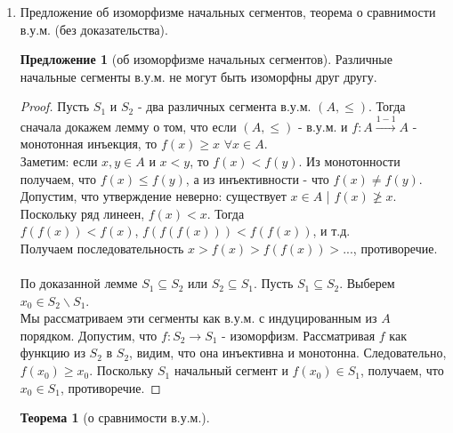 \documentclass[a4paper]{article}
\newtheorem*{theorem*}{Теорема}
\newtheorem*{lemma*}{Лемма}
\theoremstyle{definition}
\newtheorem*{proposition*}{Предложение}
\begin{document}
\begin{enumerate}
       \begin{lemma*}[о начальных сегментах в.у.м.]
        Любой начальный сегмент в.у.м. $(A, \leq)$ либо равен $A$, либо является начальным отрезком.
       \end{lemma*}
       \begin{proof}
        Пусть $S$ - начальный сегмент в $A$ и $S \neq A$. Тогда $A \backslash S \neq \emptyset$. Пусть $x$ - минимальный элемент в $A \backslash S$. Покажем, что $S = A_x$. Если $y \in S$, то либо $y < x$, либо $x \leq y$. Второй случай невозможен, так как тогда $x \in S$.
       \end{proof}
 \item Предложение об изоморфизме начальных сегментов, теорема о сравнимости в.у.м. (без доказательства).
       \begin{proposition*}[об изоморфизме начальных сегментов]
        Различные начальные сегменты в.у.м. не могут быть изоморфны друг другу.
       \end{proposition*}
       \begin{proof}
        Пусть $S_1$ и $S_2$ - два различных сегмента в.у.м. $(A, \leq)$. Тогда сначала докажем лемму о том, что если $(A, \leq)$ - в.у.м. и $f: A \xrightarrow{1-1}A$ - монотонная инъекция, то $f(x) \geq x$ $ \forall x \in A$.\\
        Заметим: если $x, y \in A$ и $x < y$, то $f(x) < f(y)$. Из монотонности получаем, что $f(x) \leq f(y)$, а из инъективности - что $f(x) \neq f(y)$.\\
        Допустим, что утверждение неверно: существует $x \in A$ | $f(x) \ngeqslant x$. Поскольку ряд линеен, $f(x) < x$. Тогда\\$f(f(x))<f(x)$, $f(f(f(x)))<f(f(x))$, и т.д.\\
         Получаем последовательность $x > f(x) > f(f(x)) > ...$, противоречие.\\ \\
         По доказанной лемме $S_1 \subseteq S_2$ или $S_2 \subseteq S_1$. Пусть $S_1 \subseteq S_2$. Выберем $x_0 \in S_2 \backslash S_1$.\\
         Мы рассматриваем эти сегменты как в.у.м. с индуцированным из $A$ порядком. Допустим, что $f: S_2\rightarrow S_1$ - изоморфизм. Рассматривая $f$ как функцию из $S_2$ в $S_2$, видим, что она инъективна и монотонна. Следовательно, $f(x_0) \geq x_0$. Поскольку $S_1$ начальный сегмент и $f(x_0) \in S_1$, получаем, что $x_0 \in S_1$, противоречие.
       \end{proof}
       \begin{theorem*}[о сравнимости в.у.м.]

\end{theorem*}
\end{enumerate}
\end{document}
